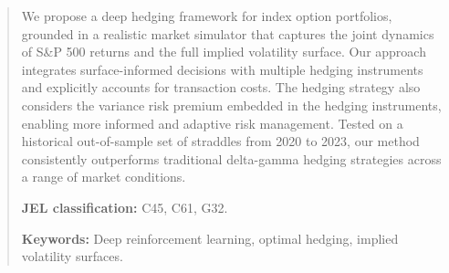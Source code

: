 \documentclass[12pt]{article}
\def\doublespacing{\setstretch{2}}
\begin{document}
\maketitle \thispagestyle{empty} %

%

\vspace{-10pt}
\begin{abstract}
\vspace{-5pt}

We propose a deep hedging framework for index option portfolios, grounded in a realistic market simulator that captures the joint dynamics of S\&P 500 returns and the full implied volatility surface. Our approach integrates surface-informed decisions with multiple hedging instruments and explicitly accounts for transaction costs. The hedging strategy also considers the variance risk premium embedded in the hedging instruments, enabling more informed and adaptive risk management. Tested on a historical out-of-sample set of straddles from 2020 to 2023, our method consistently outperforms traditional delta-gamma hedging strategies across a range of market conditions. 

\bigskip %

\vspace{-5pt}

\noindent \textbf{JEL classification:} C45, C61, G32.


\noindent \textbf{Keywords:} Deep reinforcement learning, optimal hedging, implied volatility surfaces.

\end{abstract}

\medskip

\thispagestyle{empty} \vfill \pagebreak

\setcounter{page}{1}


\doublespacing

\setcounter{page}{1}
\end{document}
